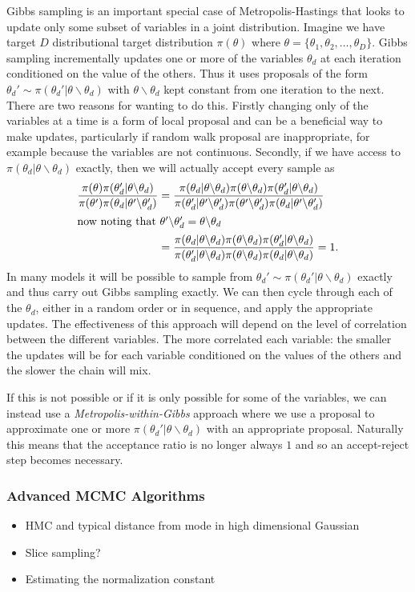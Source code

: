 Gibbs sampling is an important special case of Metropolis-Hastings that looks to update only some
subset of variables in a joint distribution.  Imagine we have target $D$ distributional target distribution
$\pi(\theta)$ where $\theta = \{\theta_1,\theta_2,\dots,\theta_D\}$.  Gibbs sampling incrementally
updates one or more of the variables $\theta_d$ at each iteration conditioned on the value of the others.
Thus it uses proposals of the form $\theta_d' \sim \pi(\theta_d' | \theta \backslash \theta_d)$ with
$ \theta \backslash \theta_d$ kept constant from one iteration to the next.  There are two reasons
for wanting to do this.  Firstly changing only of the variables at a time is a form of local proposal and
can be a beneficial way to make updates, particularly if random walk proposal are inappropriate, for example
because the variables are not continuous.  Secondly, if we have access to $\pi(\theta_d | \theta \backslash \theta_d)$
exactly, then we will actually accept every sample as
\begin{align*}
\frac{\pi(\theta)\pi(\theta_d' | \theta \backslash \theta_d)}{\pi(\theta')\pi(\theta_d | \theta' \backslash \theta_d')}
&=\frac{\pi(\theta_d |  \theta \backslash \theta_d) \pi( \theta \backslash \theta_d)
	\pi(\theta_d' | \theta \backslash \theta_d)}
{\pi(\theta_d' |  \theta' \backslash \theta_d') \pi( \theta' \backslash \theta_d')\pi(\theta_d | \theta' \backslash \theta_d')} \\
\intertext{now noting that $\theta' \backslash \theta_d' = \theta \backslash \theta_d$}
&=\frac{\pi(\theta_d |  \theta \backslash \theta_d) \pi( \theta \backslash \theta_d)
	\pi(\theta_d' | \theta \backslash \theta_d)}
{\pi(\theta_d' |  \theta \backslash \theta_d) \pi( \theta \backslash \theta_d)\pi(\theta_d | \theta \backslash \theta_d)} 
= 1.
\end{align*}
In many models it will be possible to sample from $\theta_d' \sim \pi(\theta_d' | \theta \backslash \theta_d)$
exactly and thus carry out Gibbs sampling exactly.  We can then cycle through each of
the $\theta_d$, either in a random order or in sequence, and apply the appropriate updates.  The
effectiveness of this approach will depend on the level of correlation between the different variables.  The more
correlated each variable: the smaller the updates will be for each variable conditioned on the values of the
others and the slower the chain will mix.

If this is not possible or if it is only
possible for some of the variables, we can instead use a \emph{Metropolis-within-Gibbs} approach where
we use a proposal to approximate one or more $\pi(\theta_d' | \theta \backslash \theta_d)$ with an
appropriate proposal.  Naturally this means that the acceptance ratio is no longer always $1$ and so
an accept-reject step becomes necessary.

\subsubsection{Advanced MCMC Algorithms}
\label{sec:inf:foundation:advanced}


\begin{itemize}
	\item HMC and typical distance from mode in high dimensional Gaussian
	\item Slice sampling?
	\item Estimating the normalization constant
\end{itemize}